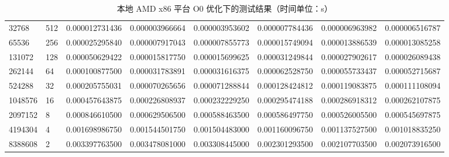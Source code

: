 \documentclass[a4paper]{article}
\begin{document}
\begin{table}[]
{\begin{tabular}{llllllll}
      32768   & 512     & 0.000012731436 & 0.000003966664 & 0.000003953602  & 0.000007784436 & 0.000006963982 & 0.000006516787 \\
      65536   & 256     & 0.000025295840 & 0.000007917043 & 0.000007855773  & 0.000015749094 & 0.000013886539 & 0.000013085258 \\
      131072  & 128     & 0.000050629422 & 0.000015817750 & 0.000015699625  & 0.000031249844 & 0.000027902617 & 0.000026089438 \\
      262144  & 64      & 0.000100877500 & 0.000031783891 & 0.000031616375  & 0.000062528750 & 0.000055733437 & 0.000052715687 \\
      524288  & 32      & 0.000205755031 & 0.000070265656 & 0.000071288844  & 0.000128424812 & 0.000119083875 & 0.000111108094 \\
      1048576 & 16      & 0.000457643875 & 0.000226808937 & 0.000232229250  & 0.000295474188 & 0.000286918312 & 0.000262107875 \\
      2097152 & 8       & 0.000846610500 & 0.000629506500 & 0.000588463500  & 0.000586497750 & 0.000526005500 & 0.000545697875 \\
      4194304 & 4       & 0.001698986750 & 0.001544501750 & 0.001504483000  & 0.001160096750 & 0.001137527500 & 0.001018835250 \\
      8388608 & 2       & 0.003397763500 & 0.003478081000 & 0.003308445000  & 0.002301293500 & 0.002107703500 & 0.002073916500
    \end{tabular}%
  }
  \caption{本地 AMD x86 平台 O0 优化下的测试结果（时间单位：s）}
  \label{tab:x86-O0-test}
\end{table}
\end{document}
